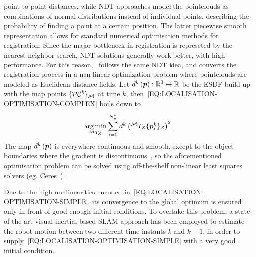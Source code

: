 point-to-point distances, while NDT approaches model the pointclouds as combinations of normal distributions instead of individual points,
describing the probability of finding a point at a certain position. The latter piecewise smooth representation allows for standard numerical optimisation methods for registration.
Since the major bottleneck in registration is represeted by the nearest neighbor search, NDT solutions generally work better, with high performance.
For this reason,~\cite{caballero2021dll} follows the same NDT idea, and converts the registration process in a non-linear optimization problem where
pointclouds are modeled as Euclidean distance fields. Let $d^k\left( \boldsymbol{p} \right) : \mathbb{R}^3 \mapsto \mathbb{R}$ be the ESDF build up with the map points
$\{\mathcal{PC}^k\}_{\mathcal{M}}$ at time $k$, then~\eqref{EQ:LOCALISATION-OPTIMISATION-COMPLEX} boils down to
\begin{equation}
    \label{EQ:LOCALISATION-OPTIMISATION-SIMPLE}
    \operatorname*{arg\,min}_{^{\mathcal{M}}T_{\mathcal{S}}} \sum_{i = 0}^{N_p^k} d^k \left( ^{\mathcal{M}}T_{\mathcal{S}} \{\boldsymbol{p}^k_i\}_{\mathcal{S}} \right)^2.
\end{equation}
The map $d^k\left( \boldsymbol{p} \right)$ is everywhere continuous and smooth, except to the object boundaries where the gradient is discontinuous~\cite{jones20063d},
so the aforementioned optimisation problem can be solved using off-the-shelf non-linear least squares solvers (eg. Ceres~\cite{agarwal2022ceres}).
\begin{remark}
    Due to the high nonlinearities encoded in~\eqref{EQ:LOCALISATION-OPTIMISATION-SIMPLE}, its convergence to the global optimum is ensured only in front of
    good enough initial conditions. To overtake this problem, a state-of-the-art visual-inertial-based SLAM approach has been employed to
    estimate the robot motion between two different time instants $k$ and $k+1$, in order to supply~\eqref{EQ:LOCALISATION-OPTIMISATION-SIMPLE}
    with a very good initial condition.
\end{remark}
